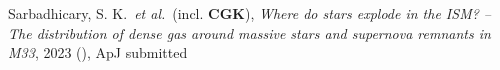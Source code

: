 \item Sarbadhicary, S. K.~\textit{et al.}~(incl. \textbf{CGK}), \textit{Where do stars explode in the ISM? -- The distribution of dense gas around massive stars and supernova remnants in M33}, 2023 (), ApJ submitted